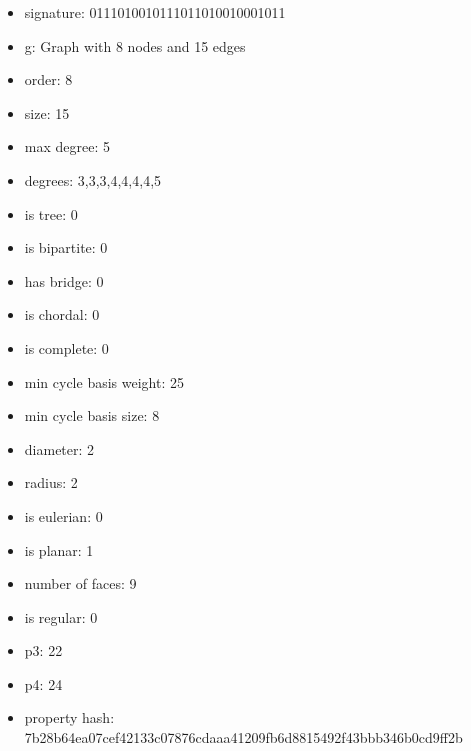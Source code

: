 \begin{itemize}
\item signature: 0111010010111011010010001011
\item g: Graph with 8 nodes and 15 edges
\item order: 8
\item size: 15
\item max degree: 5
\item degrees: 3,3,3,4,4,4,4,5
\item is tree: 0
\item is bipartite: 0
\item has bridge: 0
\item is chordal: 0
\item is complete: 0
\item min cycle basis weight: 25
\item min cycle basis size: 8
\item diameter: 2
\item radius: 2
\item is eulerian: 0
\item is planar: 1
\item number of faces: 9
\item is regular: 0
\item p3: 22
\item p4: 24
\item property hash: 7b28b64ea07cef42133c07876cdaaa41209fb6d8815492f43bbb346b0cd9ff2b
\end{itemize}
\newpage
\begin{figure}
\end{figure}
